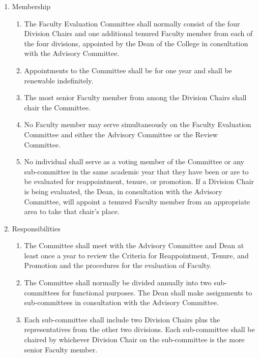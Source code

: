 \documentclass{manual}
\newcommand{\itemLevelA}{\alph*.}
\newcommand{\itemLevelB}{\arabic*)}
\newcommand{\itemRefA}{\alph*}
\newcommand{\itemRefB}{\arabic*}
\begin{document}
\begin{enumerate}[label=\itemLevelA,ref=\itemRefA]

\item Membership
\begin{enumerate}[label=\itemLevelB,ref=\itemRefB]

\item The Faculty Evaluation Committee shall normally consist of the four Division Chairs and one additional tenured Faculty member from each of the four divisions, appointed by the Dean of the College in consultation with the Advisory Committee.

\item Appointments to the Committee shall be for one year and shall be renewable indefinitely.

\item The most senior Faculty member from among the Division Chairs shall chair the Committee.

\item No Faculty member may serve simultaneously on the Faculty Evaluation Committee and either the Advisory Committee or the Review Committee.

\item No individual shall serve as a voting member of the Committee or any sub-committee in the same academic year that they have  been or are to be evaluated for reappointment, tenure, or promotion. If a Division Chair is being evaluated, the Dean, in consultation with the Advisory Committee, will appoint a tenured Faculty member from an appropriate area to take that chair's place.
\end{enumerate}

\item Responsibilities
\begin{enumerate}[label=\itemLevelB,ref=\itemRefB]

\item The Committee shall meet with the Advisory Committee and Dean at least once a year to review the Criteria for Reappointment, Tenure, and Promotion and the procedures for the evaluation of Faculty.

\item The Committee shall normally be divided annually into two sub-committees for functional purposes. The Dean shall make assignments to sub-committees in consultation with the Advisory Committee.

\item Each sub-committee shall include two Division Chairs plus the representatives from the other two divisions. Each sub-committee shall be chaired by whichever Division Chair on the sub-committee is the more senior Faculty member.


\end{enumerate}
\end{enumerate}
\end{document}
